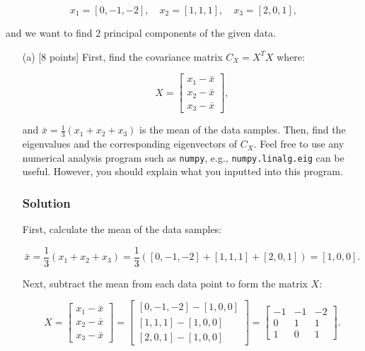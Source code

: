 \documentclass{article}
\begin{document}
\[
x_1 = [0, -1, -2], \quad x_2 = [1, 1, 1], \quad x_3 = [2, 0, 1],
\]


and we want to find 2 principal components of the given data.

\begin{enumerate}
    \item[(a)] [8 points] First, find the covariance matrix $C_X = X^T X$ where:
    

\[
    X =
    \begin{bmatrix}
    x_1 - \bar{x} \\
    x_2 - \bar{x} \\
    x_3 - \bar{x}
    \end{bmatrix},
    \]


    and $\bar{x} = \frac{1}{3}(x_1 + x_2 + x_3)$ is the mean of the data samples. Then, find the eigenvalues and the corresponding eigenvectors of $C_X$. Feel free to use any numerical analysis program such as \texttt{numpy}, e.g., \texttt{numpy.linalg.eig} can be useful. However, you should explain what you inputted into this program.

    \subsubsection*{Solution}

    First, calculate the mean of the data samples:

    \[
    \bar{x} = \frac{1}{3}(x_1 + x_2 + x_3) = \frac{1}{3} \left([0, -1, -2] + [1, 1, 1] + [2, 0, 1]\right) = [1, 0, 0].
    \]

    Next, subtract the mean from each data point to form the matrix \( X \):

    \[
    X =
    \begin{bmatrix}
    x_1 - \bar{x} \\
    x_2 - \bar{x} \\
    x_3 - \bar{x}
    \end{bmatrix}
    =
    \begin{bmatrix}
    [0, -1, -2] - [1, 0, 0] \\
    [1, 1, 1] - [1, 0, 0] \\
    [2, 0, 1] - [1, 0, 0]
    \end{bmatrix}
    =
    \begin{bmatrix}
    -1 & -1 & -2 \\
    0 & 1 & 1 \\
    1 & 0 & 1
    \end{bmatrix}.
    \]


\end{enumerate}
\end{document}

